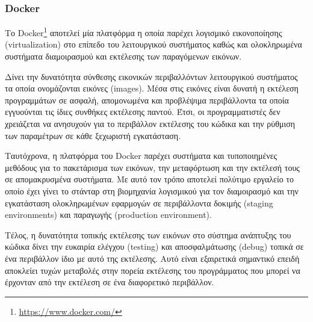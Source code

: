 \subsubsection{Docker} \label{subsection:4-2-1-2-docker}


Το Docker\footnote{\url{https://www.docker.com/}} αποτελεί μία πλατφόρμα η οποία παρέχει λογισμικό εικονοποίησης (virtualization) στο επίπεδο του λειτουργικού συστήματος καθώς και ολοκληρωμένα συστήματα διαμοιρασμού και εκτέλεσης των παραγόμενων εικόνων.

Δίνει την δυνατότητα σύνθεσης εικονικών περιβαλλόντων λειτουργικού συστήματος τα οποία ονομάζονται εικόνες (images). Μέσα στις εικόνες είναι δυνατή η εκτέλεση προγραμμάτων σε ασφαλή, απομονωμένα και προβλέψιμα περιβάλλοντα τα οποία εγγυούνται τις ίδιες συνθήκες εκτέλεσης παντού. Έτσι, οι προγραμματιστές δεν χρειάζεται να ανησυχούν για το περιβάλλον εκτέλεσης του κώδικα και την ρύθμιση των παραμέτρων σε κάθε ξεχωριστή εγκατάσταση.

Ταυτόχρονα, η πλατφόρμα του Docker παρέχει συστήματα και τυποποιημένες μεθόδους για το πακετάρισμα των εικόνων, την μεταφόρτωση και την εκτέλεσή τους σε απομακρυσμένα συστήματα. Με αυτό τον τρόπο αποτελεί πολύτιμο εργαλείο το οποίο έχει γίνει το στάνταρ στη βιομηχανία λογισμικού για τον διαμοιρασμό και την εγκατάσταση ολοκληρωμένων εφαρμογών σε περιβάλλοντα δοκιμής (staging environments) και παραγωγής (production environment).

Τέλος, η δυνατότητα τοπικής εκτέλεσης των εικόνων στο σύστημα ανάπτυξης του κώδικα δίνει την ευκαιρία ελέγχου (testing) και αποσφαλμάτωσης (debug) τοπικά σε ένα περιβάλλον ίδιο με αυτό της εκτέλεσης. Αυτό είναι εξαιρετικά σημαντικό επειδή αποκλείει τυχών μεταβολές στην πορεία εκτέλεσης του προγράμματος που μπορεί να έρχονταν από την εκτέλεση σε ένα διαφορετικό περιβάλλον.

